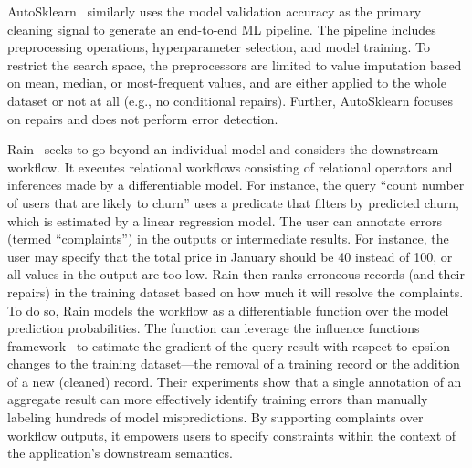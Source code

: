 \documentclass[11pt,dvipsnames]{article}
\begin{document}
AutoSklearn~\cite{AutoSklearn} similarly uses the model validation accuracy as the primary cleaning signal to generate an end-to-end ML pipeline.  The pipeline includes preprocessing operations, hyperparameter selection, and model training.  To restrict the search space, the preprocessors are limited to value imputation based on mean, median, or most-frequent values, and are either applied to the whole dataset or not at all (e.g., no conditional repairs).    Further, AutoSklearn focuses on repairs and does not perform error detection.  




Rain~\cite{ComplaintDrivenTrainingDataDebugging} seeks to go beyond an individual model and considers the downstream workflow.   It executes relational workflows consisting of relational operators and inferences made by a differentiable model.  For instance, the query ``count number of users that are likely to churn'' uses a predicate that filters by predicted churn, which is estimated by a linear regression model.     The user can annotate errors (termed ``complaints'') in the outputs or intermediate results. For instance, the user may specify that the total price in January should be 40 instead of 100, or all values in the output are too low.   Rain then ranks erroneous records (and their repairs) in the training dataset based on how much it will resolve the complaints.    
To do so, Rain models the workflow as a differentiable function over the model prediction probabilities.  The function can leverage the influence functions framework~\cite{koh2017understanding} to estimate the gradient of the query result with respect to epsilon changes to the training dataset---the removal of a training record or the addition of a new (cleaned) record.  
Their experiments show that a single annotation of an aggregate result can more effectively identify training errors than manually labeling hundreds of model mispredictions.  By supporting complaints over workflow outputs, it empowers users to specify constraints within the context of the application's downstream semantics.
\end{document}
